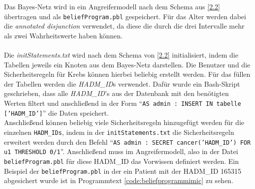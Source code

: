 \documentclass[german,version-2020-11]{uzl-thesis}
\begin{document}
\begin{figure}[htpb]
\end{figure}Das Bayes-Netz wird in ein Angreifermodell nach dem Schema aus \ref{2.2} übertragen und als \texttt{beliefProgram.pbl} gespeichert. Für das Alter werden dabei die \textit{annotated disjunction} verwendet, da diese die durch die drei Intervalle mehr als zwei Wahrheitswerte haben können. \\ \\
Die \textit{initStatements.txt} wird nach dem Schema von \ref{2.2} initialisiert, indem die Tabellen jeweils ein Knoten aus dem Bayes-Netz darstellen. Die Benutzer und die Sicherheitsregeln für Krebs können hierbei beliebig erstellt werden. Für das füllen der Tabellen werden die \textit{HADM\_ID}s verwendet. Dafür wurde ein Bash-Skript geschrieben, dass alle \textit{HADM\_ID}'s  aus der Datenbank mit den benötigten Werten filtert und anschließend in der Form \enquote{\texttt{AS admin : INSERT IN tabelle ['HADM\_ID']}} die Daten speichert. \\ 
Anschließend können beliebig viele Sicherheitsregeln hinzugefügt werden für die einzelnen \texttt{HADM\_IDs}, indem in der \texttt{initStatements.txt} die Sicherheitsregeln erweitert werden durch den Befehl \enquote{\texttt{AS admin : SECRET cancer('HADM\_ID') FOR u1 THRESHOLD 0/1}}. Anschließend muss im Angreifermodell, also in der Datei \texttt{beliefProgram.pbl} für diese HADM\_ID das Vorwissen definiert werden. Ein Beispiel der \texttt{beliefProgram.pbl} in der ein Patient mit der HADM\_ID 165315 abgesichert wurde ist in Programmtext  \ref{code:beliefprogrammimic} zu sehen. 
\end{document}
